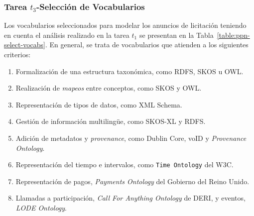 \subsubsection{Tarea $t_3$-Selección de Vocabularios}
Los vocabularios seleccionados para modelar los anuncios de licitación teniendo en cuenta el análisis 
 realizado en la tarea $t_1$ se presentan en la Tabla~\ref{table:ppn-select-vocabs}. En general, se trata de vocabularios 
 que atienden a los siguientes criterios:
% 
\begin{enumerate}
  \item Formalización de una estructura taxonómica, como RDFS, \gls{SKOS} u \gls{OWL}.
  \item Realización de \textit{mapeos} entre conceptos, como SKOS y OWL.
  \item Representación de tipos de datos, como \gls{XML Schema}.
  \item Gestión de información multiling\"{u}e, como \gls{SKOS-XL} y RDFS.
  \item Adición de metadatos y \textit{provenance}, como Dublin Core, \gls{voID} y \textit{Provenance Ontology}.
  \item Representación del tiempo e intervalos, como \texttt{Time Ontology} del \gls{W3C}.
  \item Representación de pagos, \textit{Payments Ontology} del Gobierno del Reino Unido.
  \item Llamadas a participación, \textit{Call For Anything Ontology} de DERI, y eventos, \textit{LODE Ontology}.
 \end{enumerate}


